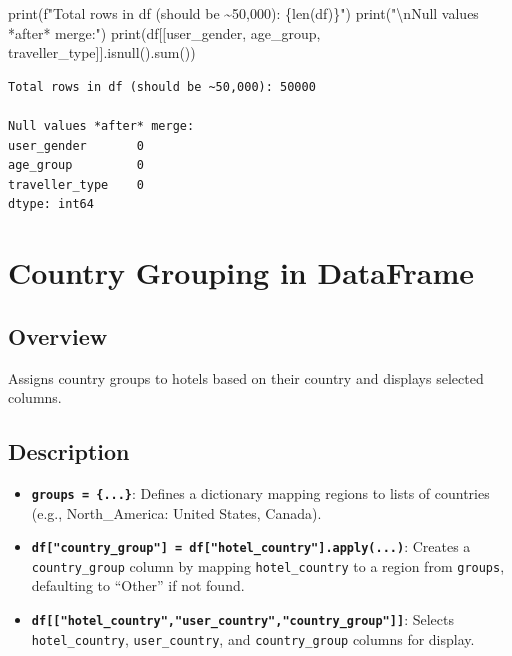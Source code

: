 \documentclass[
  letterpaper,
  DIV=11,
  numbers=noendperiod]{scrartcl}
\newenvironment{Shaded}{\begin{snugshade}}{\end{snugshade}}
\newcommand{\BuiltInTok}[1]{\textcolor[rgb]{0.00,0.23,0.31}{#1}}
\newcommand{\CharTok}[1]{\textcolor[rgb]{0.13,0.47,0.30}{#1}}
\newcommand{\NormalTok}[1]{\textcolor[rgb]{0.00,0.23,0.31}{#1}}
\newcommand{\SpecialCharTok}[1]{\textcolor[rgb]{0.37,0.37,0.37}{#1}}
\newcommand{\SpecialStringTok}[1]{\textcolor[rgb]{0.13,0.47,0.30}{#1}}
\newcommand{\StringTok}[1]{\textcolor[rgb]{0.13,0.47,0.30}{#1}}
\providecommand{\tightlist}{%
  \setlength{\itemsep}{0pt}\setlength{\parskip}{0pt}}
\begin{document}
\begin{Shaded}
\begin{Highlighting}[]
\BuiltInTok{print}\NormalTok{(}\SpecialStringTok{f"Total rows in df (should be \textasciitilde{}50,000): }\SpecialCharTok{\{}\BuiltInTok{len}\NormalTok{(df)}\SpecialCharTok{\}}\SpecialStringTok{"}\NormalTok{)}
\BuiltInTok{print}\NormalTok{(}\StringTok{"}\CharTok{\textbackslash{}n}\StringTok{Null values *after* merge:"}\NormalTok{)}
\BuiltInTok{print}\NormalTok{(df[[}\StringTok{\textquotesingle{}user\_gender\textquotesingle{}}\NormalTok{, }\StringTok{\textquotesingle{}age\_group\textquotesingle{}}\NormalTok{, }\StringTok{\textquotesingle{}traveller\_type\textquotesingle{}}\NormalTok{]].isnull().}\BuiltInTok{sum}\NormalTok{())}
\end{Highlighting}
\end{Shaded}

\begin{verbatim}
Total rows in df (should be ~50,000): 50000

Null values *after* merge:
user_gender       0
age_group         0
traveller_type    0
dtype: int64
\end{verbatim}

\section{Country Grouping in
DataFrame}\label{country-grouping-in-dataframe}

\subsection{Overview}\label{overview-3}

Assigns country groups to hotels based on their country and displays
selected columns.

\subsection{Description}\label{description-1}

\begin{itemize}
\tightlist
\item
  \textbf{\texttt{groups\ =\ \{...\}}}: Defines a dictionary mapping
  regions to lists of countries (e.g., North\_America: United States,
  Canada).
\item
  \textbf{\texttt{df{[}"country\_group"{]}\ =\ df{[}"hotel\_country"{]}.apply(...)}}:
  Creates a \texttt{country\_group} column by mapping
  \texttt{hotel\_country} to a region from \texttt{groups}, defaulting
  to ``Other'' if not found.
\item
  \textbf{\texttt{df{[}{[}"hotel\_country","user\_country","country\_group"{]}{]}}}:
  Selects \texttt{hotel\_country}, \texttt{user\_country}, and
  \texttt{country\_group} columns for display.
\end{itemize}
\end{document}
